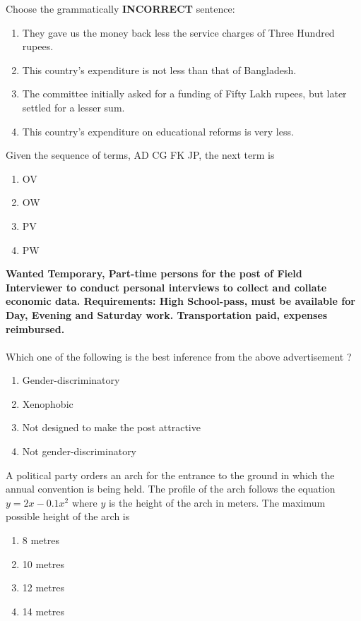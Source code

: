  \item Choose the grammatically \textbf{INCORRECT} sentence:
 \begin{enumerate}
    \item They gave us the money back less the service charges of Three Hundred rupees.
    \item This country's expenditure is not less than that of Bangladesh.
    \item The committee initially asked for a funding of Fifty Lakh rupees, but later settled for a lesser sum.
    \item This country's expenditure on educational reforms is very less.\\
 \end{enumerate}
\item Given the sequence of terms, AD CG FK JP, the next term is
\begin{enumerate}
     \item OV
     \item OW
     \item PV
     \item PW \\
 \end{enumerate}
\item \textbf{Wanted Temporary, Part-time persons for the post of Field Interviewer to conduct personal interviews to collect and collate economic data. Requirements: High School-pass, must be available for Day, Evening and Saturday work. Transportation paid, expenses reimbursed.}\\\\
Which one of the following is the best inference from the above advertisement ? 
\begin{enumerate}
    \item Gender-discriminatory 
    \item Xenophobic
    \item Not designed to make the post attractive
    \item Not gender-discriminatory  \\
\end{enumerate}
\item A political party orders an arch for the entrance to the ground in which the annual convention is being held. The profile of the arch follows the equation $y = 2x - 0.1x^2$ where $y$ is the height of the arch in meters. The maximum possible height of the arch is 
\begin{enumerate}
    \item 8 metres
    \item 10 metres
    \item 12 metres
    \item 14 metres \\
\end{enumerate}
